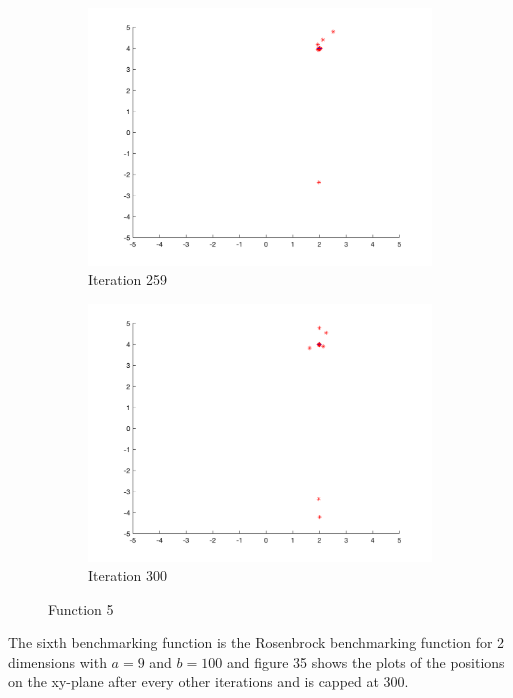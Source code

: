 \begin{figure}
\begin{subfigure}[b]{0.4\textwidth}
    \includegraphics[width=\textwidth]{img/smpl/rosn2d-2-100/loa-iter-259}
    \caption{Iteration 259}
    \label{fig:s5-iter-6}
  \end{subfigure}
  \begin{subfigure}[b]{0.4\textwidth}
    \includegraphics[width=\textwidth]{img/smpl/rosn2d-2-100/loa-iter-300}
    \caption{Iteration 300}
    \label{fig:s5-iter-7}
  \end{subfigure}
  \caption{Function 5}
\end{figure}


The sixth benchmarking function is the Rosenbrock benchmarking function for 2 dimensions with $a = 9$ and $b=100$ and figure 35 shows the plots of the positions on the xy-plane after every other iterations and is capped at 300.

